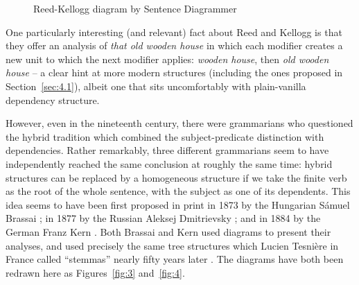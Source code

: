 \documentclass[output=paper
	        ,collection
	        ,collectionchapter
 	        ,biblatex
                ,babelshorthands
                ,newtxmath
                ,draftmode
                ,colorlinks, citecolor=brown
]{./langsci/langscibook}
\begin{document}
 \begin{figure}
 	\centering
{}
	\caption{Reed-Kellogg diagram by Sentence Diagrammer}
	\label{fig:2}
 \end{figure}
 
One particularly interesting (and relevant) fact about Reed and Kellogg is that they offer an analysis of \emph{that old wooden house} in which each modifier creates a new unit to which the next modifier applies: \emph{wooden house}, then \emph{old wooden house} \citep[18]{Percival1976} – a clear hint at more modern structures (including the ones proposed in Section~\ref{sec:4.1}), albeit one that sits uncomfortably with plain-vanilla dependency structure.
 
However, even in the nineteenth century, there were grammarians who questioned the hybrid tradition which combined the subject-predicate distinction with dependencies. Rather remarkably, three different grammarians seem to have independently reached the same conclusion at roughly the same time: hybrid structures can be replaced by a homogeneous structure if we take the finite verb as the root of the whole sentence, with the subject as one of its dependents. This idea seems to have been first proposed in print in 1873 by the Hungarian Sámuel Brassai \citep{Imrenyi2013a,ImrenyiVladarTBA}; in 1877 by the Russian Aleksej Dmitrievsky \citep{Seriot2004}; and in 1884 by the German Franz Kern \citep{Kern1884a-u}. Both Brassai and Kern used diagrams to present their analyses, and used precisely the same tree structures which Lucien Tesnière in France called ``stemmas'' nearly fifty years later \citep{Tesniere59a-u,Tesniere2015a-u}. The diagrams have both been redrawn here as Figures~\ref{fig:3} and~\ref{fig:4}.
\end{document}
